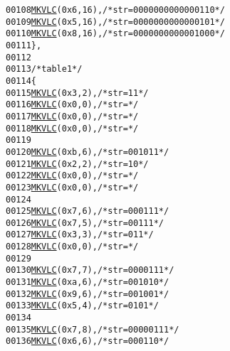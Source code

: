 \begin{footnotesize}
\begin{alltt}
00108         \hyperlink{vlc_8h_aa680b26539d09b5954221ff39a127faa}{MKVLC}( 0x6, 16 ), \textcolor{comment}{/* str=0000000000000110 */}
00109         \hyperlink{vlc_8h_aa680b26539d09b5954221ff39a127faa}{MKVLC}( 0x5, 16 ), \textcolor{comment}{/* str=0000000000000101 */}
00110         \hyperlink{vlc_8h_aa680b26539d09b5954221ff39a127faa}{MKVLC}( 0x8, 16 ), \textcolor{comment}{/* str=0000000000001000 */}
00111     \},
00112 
00113     \textcolor{comment}{/* table 1 */}
00114     \{
00115         \hyperlink{vlc_8h_aa680b26539d09b5954221ff39a127faa}{MKVLC}( 0x3, 2 ), \textcolor{comment}{/* str=11 */}
00116         \hyperlink{vlc_8h_aa680b26539d09b5954221ff39a127faa}{MKVLC}( 0x0, 0 ), \textcolor{comment}{/* str= */}
00117         \hyperlink{vlc_8h_aa680b26539d09b5954221ff39a127faa}{MKVLC}( 0x0, 0 ), \textcolor{comment}{/* str= */}
00118         \hyperlink{vlc_8h_aa680b26539d09b5954221ff39a127faa}{MKVLC}( 0x0, 0 ), \textcolor{comment}{/* str= */}
00119 
00120         \hyperlink{vlc_8h_aa680b26539d09b5954221ff39a127faa}{MKVLC}( 0xb, 6 ), \textcolor{comment}{/* str=001011 */}
00121         \hyperlink{vlc_8h_aa680b26539d09b5954221ff39a127faa}{MKVLC}( 0x2, 2 ), \textcolor{comment}{/* str=10 */}
00122         \hyperlink{vlc_8h_aa680b26539d09b5954221ff39a127faa}{MKVLC}( 0x0, 0 ), \textcolor{comment}{/* str= */}
00123         \hyperlink{vlc_8h_aa680b26539d09b5954221ff39a127faa}{MKVLC}( 0x0, 0 ), \textcolor{comment}{/* str= */}
00124 
00125         \hyperlink{vlc_8h_aa680b26539d09b5954221ff39a127faa}{MKVLC}( 0x7, 6 ), \textcolor{comment}{/* str=000111 */}
00126         \hyperlink{vlc_8h_aa680b26539d09b5954221ff39a127faa}{MKVLC}( 0x7, 5 ), \textcolor{comment}{/* str=00111 */}
00127         \hyperlink{vlc_8h_aa680b26539d09b5954221ff39a127faa}{MKVLC}( 0x3, 3 ), \textcolor{comment}{/* str=011 */}
00128         \hyperlink{vlc_8h_aa680b26539d09b5954221ff39a127faa}{MKVLC}( 0x0, 0 ), \textcolor{comment}{/* str= */}
00129 
00130         \hyperlink{vlc_8h_aa680b26539d09b5954221ff39a127faa}{MKVLC}( 0x7, 7 ), \textcolor{comment}{/* str=0000111 */}
00131         \hyperlink{vlc_8h_aa680b26539d09b5954221ff39a127faa}{MKVLC}( 0xa, 6 ), \textcolor{comment}{/* str=001010 */}
00132         \hyperlink{vlc_8h_aa680b26539d09b5954221ff39a127faa}{MKVLC}( 0x9, 6 ), \textcolor{comment}{/* str=001001 */}
00133         \hyperlink{vlc_8h_aa680b26539d09b5954221ff39a127faa}{MKVLC}( 0x5, 4 ), \textcolor{comment}{/* str=0101 */}
00134 
00135         \hyperlink{vlc_8h_aa680b26539d09b5954221ff39a127faa}{MKVLC}( 0x7, 8 ), \textcolor{comment}{/* str=00000111 */}
00136         \hyperlink{vlc_8h_aa680b26539d09b5954221ff39a127faa}{MKVLC}( 0x6, 6 ), \textcolor{comment}{/* str=000110 */}

\end{alltt}
\end{footnotesize}
